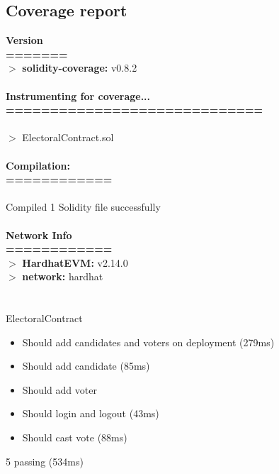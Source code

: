 \documentclass[oneside, 12pt]{book}
\begin{document}
\subsection{Coverage report}
\colorbox{gray!20}{%
	\begin{minipage}{\linewidth}%
		\vspace*{2pt}
		\textbf{Version}
		\\\textbf{=======}
		\\$>$ \textbf{solidity-coverage:} v0.8.2
			\\\\\textbf{Instrumenting for coverage...}
			\\\textbf{=============================}
			\\\\$>$ ElectoralContract.sol
		\\\\\textbf{Compilation:}
		\\\textbf{============}
		\\\\Compiled 1 Solidity file successfully
		\\\\\textbf{Network Info}
		\\\textbf{============}
		\\$>$ \textbf{HardhatEVM:} v2.14.0
			\\$>$ \textbf{network:}    hardhat
		\\\\\\ElectoralContract
		\begin{itemize}
			\item[\checkmark] Should add candidates and voters on deployment (279ms)
			\item[\checkmark] Should add candidate (85ms)
			\item[\checkmark] Should add voter
			\item[\checkmark] Should login and logout (43ms)
			\item[\checkmark] Should cast vote (88ms)
		\end{itemize}
		5 passing (534ms)
		\begin{table}[H]
\end{table}
\end{minipage}}
\end{document}
